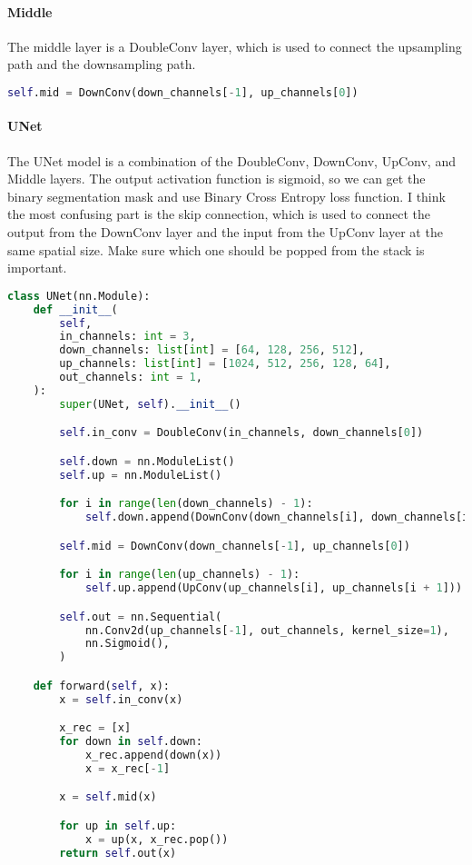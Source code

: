 \paragraph{Middle}
The middle layer is a DoubleConv layer, which is used to connect the upsampling path and the downsampling path.

\begin{lstlisting}[language=Python, caption=models/unet.py: UNet]
self.mid = DownConv(down_channels[-1], up_channels[0])
\end{lstlisting}

\paragraph{UNet}
The UNet model is a combination of the DoubleConv, DownConv, UpConv, and Middle layers. The output activation function is sigmoid, so we can get the binary segmentation mask and use Binary Cross Entropy loss function.
I think the most confusing part is the skip connection, which is used to connect the output from the DownConv layer and the input from the UpConv layer at the same spatial size. Make sure which one should be popped from the stack is important.

\begin{lstlisting}[language=Python, caption=models/unet.py: UNet, label=lst:unet]
    class UNet(nn.Module):
    def __init__(
        self,
        in_channels: int = 3,
        down_channels: list[int] = [64, 128, 256, 512],
        up_channels: list[int] = [1024, 512, 256, 128, 64],
        out_channels: int = 1,
    ):
        super(UNet, self).__init__()

        self.in_conv = DoubleConv(in_channels, down_channels[0])

        self.down = nn.ModuleList()
        self.up = nn.ModuleList()

        for i in range(len(down_channels) - 1):
            self.down.append(DownConv(down_channels[i], down_channels[i + 1]))

        self.mid = DownConv(down_channels[-1], up_channels[0])

        for i in range(len(up_channels) - 1):
            self.up.append(UpConv(up_channels[i], up_channels[i + 1]))

        self.out = nn.Sequential(
            nn.Conv2d(up_channels[-1], out_channels, kernel_size=1),
            nn.Sigmoid(),
        )

    def forward(self, x):
        x = self.in_conv(x)

        x_rec = [x]
        for down in self.down:
            x_rec.append(down(x))
            x = x_rec[-1]

        x = self.mid(x)

        for up in self.up:
            x = up(x, x_rec.pop())
        return self.out(x)
\end{lstlisting}


